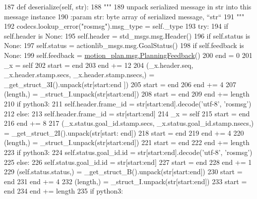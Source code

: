 \begin{DoxyCode}
187   \textcolor{keyword}{def }deserialize(self, str):
188     \textcolor{stringliteral}{"""}
189 \textcolor{stringliteral}{    unpack serialized message in str into this message instance}
190 \textcolor{stringliteral}{    :param str: byte array of serialized message, ``str``}
191 \textcolor{stringliteral}{    """}
192     codecs.lookup\_error(\textcolor{stringliteral}{"rosmsg"}).msg\_type = self.\_type
193     \textcolor{keywordflow}{try}:
194       \textcolor{keywordflow}{if} self.header \textcolor{keywordflow}{is} \textcolor{keywordtype}{None}:
195         self.header = std\_msgs.msg.Header()
196       \textcolor{keywordflow}{if} self.status \textcolor{keywordflow}{is} \textcolor{keywordtype}{None}:
197         self.status = actionlib\_msgs.msg.GoalStatus()
198       \textcolor{keywordflow}{if} self.feedback \textcolor{keywordflow}{is} \textcolor{keywordtype}{None}:
199         self.feedback = \hyperlink{classmotion__plan_1_1msg_1_1__PlanningFeedback_1_1PlanningFeedback}{motion\_plan.msg.PlanningFeedback}()
200       end = 0
201       \_x = self
202       start = end
203       end += 12
204       (\_x.header.seq, \_x.header.stamp.secs, \_x.header.stamp.nsecs,) = \_get\_struct\_3I().unpack(str[start:end
      ])
205       start = end
206       end += 4
207       (length,) = \_struct\_I.unpack(str[start:end])
208       start = end
209       end += length
210       \textcolor{keywordflow}{if} python3:
211         self.header.frame\_id = str[start:end].decode(\textcolor{stringliteral}{'utf-8'}, \textcolor{stringliteral}{'rosmsg'})
212       \textcolor{keywordflow}{else}:
213         self.header.frame\_id = str[start:end]
214       \_x = self
215       start = end
216       end += 8
217       (\_x.status.goal\_id.stamp.secs, \_x.status.goal\_id.stamp.nsecs,) = \_get\_struct\_2I().unpack(str[start:
      end])
218       start = end
219       end += 4
220       (length,) = \_struct\_I.unpack(str[start:end])
221       start = end
222       end += length
223       \textcolor{keywordflow}{if} python3:
224         self.status.goal\_id.id = str[start:end].decode(\textcolor{stringliteral}{'utf-8'}, \textcolor{stringliteral}{'rosmsg'})
225       \textcolor{keywordflow}{else}:
226         self.status.goal\_id.id = str[start:end]
227       start = end
228       end += 1
229       (self.status.status,) = \_get\_struct\_B().unpack(str[start:end])
230       start = end
231       end += 4
232       (length,) = \_struct\_I.unpack(str[start:end])
233       start = end
234       end += length
235       \textcolor{keywordflow}{if} python3:

\end{DoxyCode}
